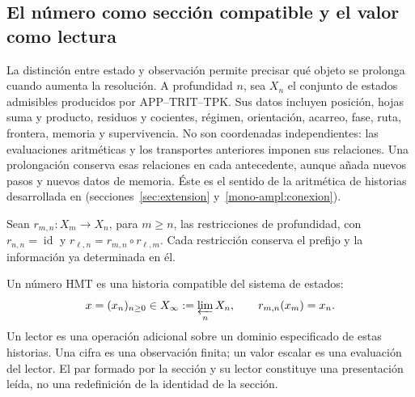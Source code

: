 
\subsection{El número como sección compatible y el valor como lectura}
\label{hist:seccion}

La distinción entre estado y observación permite precisar qué objeto se
prolonga cuando aumenta la resolución. A profundidad \(n\), sea \(X_n\)
el conjunto de estados admisibles producidos por APP--TRIT--TPK. Sus datos
incluyen posición, hojas suma y producto, residuos y cocientes, régimen,
orientación, acarreo, fase, ruta, frontera, memoria y supervivencia. No son
coordenadas independientes: las evaluaciones aritméticas y los transportes
anteriores imponen sus relaciones. Una prolongación conserva esas relaciones
en cada antecedente, aunque añada nuevos pasos y nuevos datos de memoria.
Éste es el sentido de la aritmética de historias desarrollada en
(secciones~\ref{sec:extension} y~\ref{mono-ampl:conexion}).

Sean \(r_{m,n}:X_m\to X_n\), para \(m\geq n\), las restricciones de
profundidad, con \(r_{n,n}=\operatorname{id}\) y
\(r_{\ell,n}=r_{m,n}\circ r_{\ell,m}\). Cada restricción conserva el
prefijo y la información ya determinada en él.

\begin{definition}
Un número HMT es una historia compatible del sistema de estados:
\begin{equation}
 x=(x_n)_{n\geq0}\in X_\infty:=\varprojlim_n X_n,
 \qquad r_{m,n}(x_m)=x_n.
 \label{hist:limite-inverso}
\end{equation}
Un lector es una operación adicional sobre un dominio especificado de estas
historias. Una cifra es una observación finita; un valor escalar es una
evaluación del lector. El par formado por la sección y su lector constituye
una presentación leída, no una redefinición de la identidad de la sección.
\end{definition}

